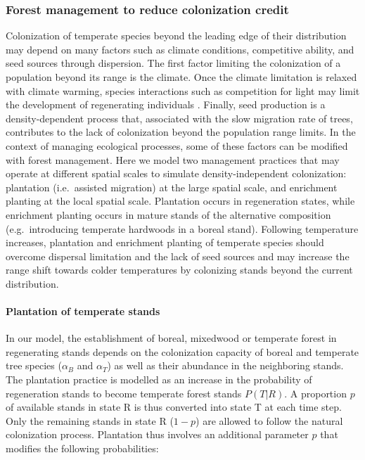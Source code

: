 \hypertarget{forest-management-to-reduce-colonization-credit}{%
\subsubsection{Forest management to reduce colonization
credit}\label{forest-management-to-reduce-colonization-credit}}

Colonization of temperate species beyond the leading edge of their
distribution may depend on many factors such as climate conditions,
competitive ability, and seed sources through dispersion. The first
factor limiting the colonization of a population beyond its range is the
climate. Once the climate limitation is relaxed with climate warming,
species interactions such as competition for light may limit the
development of regenerating individuals \citep[e.g.~][]{Bianchi2018}.
Finally, seed production is a density-dependent process that, associated
with the slow migration rate of trees, contributes to the lack of
colonization beyond the population range limits. In the context of
managing ecological processes, some of these factors can be modified
with forest management. Here we model two management practices that may
operate at different spatial scales to simulate density-independent
colonization: plantation (i.e.~assisted migration) at the large spatial
scale, and enrichment planting at the local spatial scale. Plantation
occurs in regeneration states, while enrichment planting occurs in
mature stands of the alternative composition (e.g.~introducing temperate
hardwoods in a boreal stand). Following temperature increases,
plantation and enrichment planting of temperate species should overcome
dispersal limitation and the lack of seed sources and may increase the
range shift towards colder temperatures by colonizing stands beyond the
current distribution.\\

\hypertarget{plantation-of-temperate-stands}{%
\paragraph{Plantation of temperate
stands}\label{plantation-of-temperate-stands}}

In our model, the establishment of boreal, mixedwood or temperate forest
in regenerating stands depends on the colonization capacity of boreal
and temperate tree species (\(\alpha_B\) and \(\alpha_T\)) as well as
their abundance in the neighboring stands. The plantation practice is
modelled as an increase in the probability of regeneration stands to
become temperate forest stands \(P(T|R)\). A proportion \(p\) of
available stands in state R is thus converted into state T at each time
step. Only the remaining stands in state R (\(1-p\)) are allowed to
follow the natural colonization process. Plantation thus involves an
additional parameter \(p\) that modifies the following probabilities:\\

